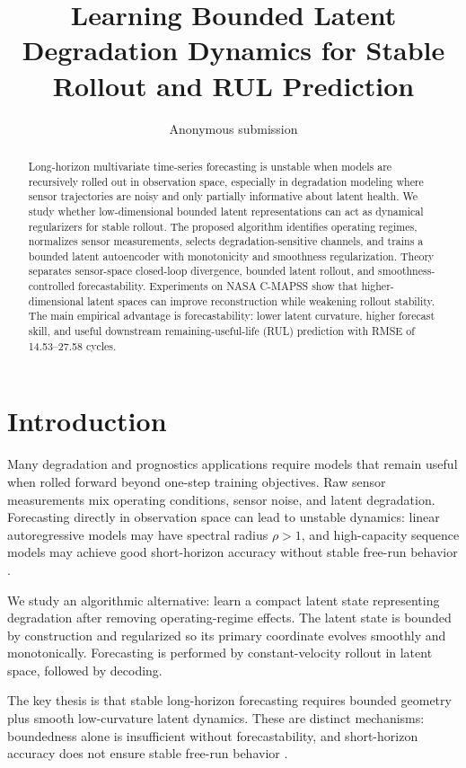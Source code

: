 \documentclass[letterpaper]{article}
\title{Learning Bounded Latent Degradation Dynamics for Stable Rollout and RUL Prediction}
\author{
    Anonymous submission
}
\begin{document}
\maketitle

\begin{abstract}
Long-horizon multivariate time-series forecasting is unstable when models are recursively rolled out in observation space, especially in degradation modeling where sensor trajectories are noisy and only partially informative about latent health. We study whether low-dimensional bounded latent representations can act as dynamical regularizers for stable rollout. The proposed algorithm identifies operating regimes, normalizes sensor measurements, selects degradation-sensitive channels, and trains a bounded latent autoencoder with monotonicity and smoothness regularization. Theory separates sensor-space closed-loop divergence, bounded latent rollout, and smoothness-controlled forecastability. Experiments on NASA C-MAPSS show that higher-dimensional latent spaces can improve reconstruction while weakening rollout stability. The main empirical advantage is forecastability: lower latent curvature, higher forecast skill, and useful downstream remaining-useful-life (RUL) prediction with RMSE of 14.53--27.58 cycles.
\end{abstract}

\section{Introduction}

Many degradation and prognostics applications require models that remain useful when rolled forward beyond one-step training objectives. Raw sensor measurements mix operating conditions, sensor noise, and latent degradation. Forecasting directly in observation space can lead to unstable dynamics: linear autoregressive models may have spectral radius $\rho > 1$, and high-capacity sequence models may achieve good short-horizon accuracy without stable free-run behavior \cite{lim2021temporal,chen2021autoregressive}.

We study an algorithmic alternative: learn a compact latent state representing degradation after removing operating-regime effects. The latent state is bounded by construction and regularized so its primary coordinate evolves smoothly and monotonically. Forecasting is performed by constant-velocity rollout in latent space, followed by decoding.

The key thesis is that stable long-horizon forecasting requires bounded geometry plus smooth low-curvature latent dynamics. These are distinct mechanisms: boundedness alone is insufficient without forecastability, and short-horizon accuracy does not ensure stable free-run behavior \cite{torres2021deep,madaeni2017trajectory}.
\end{document}

